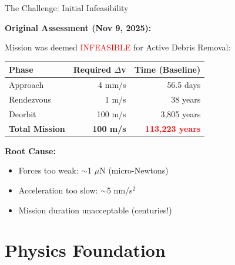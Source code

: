 \documentclass[11pt]{beamer}
\begin{document}
\begin{frame}{The Challenge: Initial Infeasibility}

\textbf{Original Assessment (Nov 9, 2025):}

Mission was deemed \textcolor{red}{INFEASIBLE} for Active Debris Removal:

\vspace{0.3cm}

\begin{table}[h]
\centering
\begin{tabular}{lrr}
\toprule
\textbf{Phase} & \textbf{Required $\Delta$v} & \textbf{Time (Baseline)} \\
\midrule
Approach & 4 mm/s & 56.5 days \\
Rendezvous & 1 m/s & 38 years \\
Deorbit & 100 m/s & 3,805 years \\
\textbf{Total Mission} & \textbf{~100 m/s} & \textcolor{red}{\textbf{113,223 years}} \\
\bottomrule
\end{tabular}
\end{table}

\vspace{0.3cm}

\textbf{Root Cause:}
\begin{itemize}
\item Forces too weak: $\sim$1 $\mu$N (micro-Newtons)
\item Acceleration too slow: $\sim$5 nm/s$^2$
\item Mission duration unacceptable (centuries!)
\end{itemize}

\end{frame}

\section{Physics Foundation}
\end{document}
